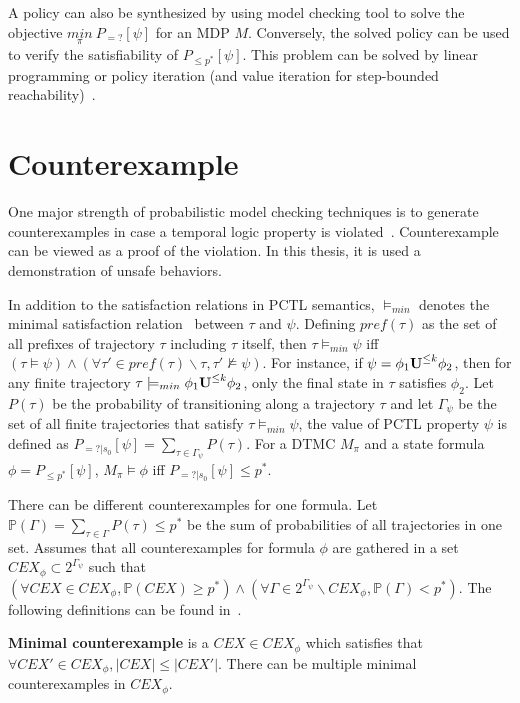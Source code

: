 A policy can also be synthesized by using model checking tool to solve the objective $\underset{\pi}{min}\ P_{=?}[\psi]$ for an MDP $M$. Conversely, the solved policy can be used to verify the satisfiability of $P_{\leq p^*}[\psi]$. 
This problem can be solved by linear programming or policy iteration (and value iteration for step-bounded reachability)~\cite{Kwiatkowska2013}.

\section{Counterexample}
One major strength of probabilistic model checking techniques is to generate counterexamples in case a temporal logic property is violated~\cite{4770111}. Counterexample can be viewed as a proof of the violation. In this thesis, it is used a demonstration of unsafe behaviors.

In addition to the satisfaction relations in PCTL semantics, $\models_{min}$ denotes the minimal satisfaction relation~\cite{4770111} between $\tau$ and $\psi$. Defining $pref(\tau)$ as the set of all prefixes of trajectory $\tau$ including $\tau$ itself, then $\tau\models_{min} \psi$ iff $(\tau\models\psi) \wedge (\forall \tau'\in pref(\tau)\backslash\tau, \tau' \nvDash \psi)$. For instance, if $\psi=\phi_1 {\textbf{U}}^{\leq k}\phi_2$, then for any finite trajectory $\tau\models_{min}\phi_1 {\textbf{U}}^{\leq k}\phi_2$, only the final state in $\tau$ satisfies $\phi_2$. Let $P(\tau)$ be the probability of transitioning along a trajectory $\tau$ and let $\Gamma_\psi$ be the set of all finite trajectories that satisfy $\tau\models_{min}\psi$, the value of PCTL property $\psi$ is defined as $P_{=?|s_0}[\psi]=\sum\limits_{\tau\in\Gamma_\psi}P(\tau)$. For a DTMC $M_{\pi}$ and a state formula $\phi= P_{\leq p^*}[\psi]$, $M_{\pi} \models \phi$ iff $P_{=?|s_0}[\psi]\leq p^*$. 

There can be different counterexamples for one formula. Let $\mathbb{P}(\Gamma) = \sum_{\tau\in \Gamma}P(\tau)\leq p^*$ be the sum of probabilities of all trajectories in one set. Assumes that all counterexamples for formula $\phi$ are gathered in a set $CEX_{\phi}\subset 2^{\Gamma_\psi}$ such that $(\forall CEX\in CEX_{\phi},\mathbb{P}(CEX)\geq p^*) \wedge (\forall \Gamma\in 2^{\Gamma_\psi}\backslash CEX_{\phi}, \mathbb{P}(\Gamma)< p^*)$. The following definitions can be found in~\cite{4770111}.

\begin{definition}
\textbf{Minimal counterexample} is a $CEX\in CEX_{\phi}$ which satisfies that $\forall CEX'\in CEX_{\phi}, |CEX|\leq|CEX'|$. There can be multiple minimal counterexamples in $CEX_{\phi}$.
\end{definition}

